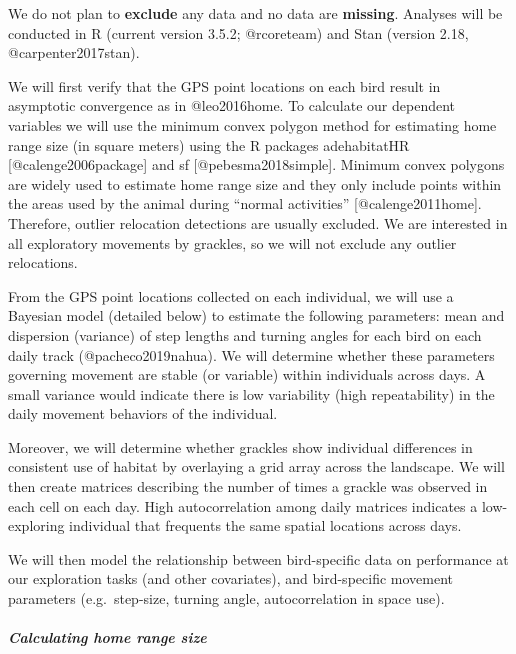 \documentclass[]{article}
\let\oldparagraph\paragraph
\renewcommand{\paragraph}[1]{\oldparagraph{#1}\mbox{}}
\begin{document}
We do not plan to \textbf{exclude} any data and no data are
\textbf{missing}. Analyses will be conducted in R (current version
3.5.2; @rcoreteam) and Stan (version 2.18, @carpenter2017stan).

We will first verify that the GPS point locations on each bird result in
asymptotic convergence as in @leo2016home. To calculate our dependent
variables we will use the minimum convex polygon method for estimating
home range size (in square meters) using the R packages adehabitatHR
{[}@calenge2006package{]} and sf {[}@pebesma2018simple{]}. Minimum
convex polygons are widely used to estimate home range size and they
only include points within the areas used by the animal during ``normal
activities'' {[}@calenge2011home{]}. Therefore, outlier relocation
detections are usually excluded. We are interested in all exploratory
movements by grackles, so we will not exclude any outlier relocations.

From the GPS point locations collected on each individual, we will use a
Bayesian model (detailed below) to estimate the following parameters:
mean and dispersion (variance) of step lengths and turning angles for
each bird on each daily track (@pacheco2019nahua). We will determine
whether these parameters governing movement are stable (or variable)
within individuals across days. A small variance would indicate there is
low variability (high repeatability) in the daily movement behaviors of
the individual.

Moreover, we will determine whether grackles show individual differences
in consistent use of habitat by overlaying a grid array across the
landscape. We will then create matrices describing the number of times a
grackle was observed in each cell on each day. High autocorrelation
among daily matrices indicates a low-exploring individual that frequents
the same spatial locations across days.

We will then model the relationship between bird-specific data on
performance at our exploration tasks (and other covariates), and
bird-specific movement parameters (e.g.~step-size, turning angle,
autocorrelation in space use).

\paragraph{\texorpdfstring{\emph{Calculating home range
size}}{Calculating home range size}}\label{calculating-home-range-size}
\end{document}
